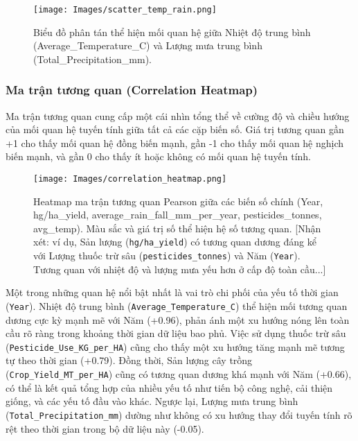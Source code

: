 \begin{figure}[htb] 
    \centering
    \texttt{[image: Images/scatter\_temp\_rain.png]}
    \vspace{8pt}
    \caption{Biểu đồ phân tán thể hiện mối quan hệ giữa Nhiệt độ trung bình (Average\_Temperature\_C) và Lượng mưa trung bình (Total\_Precipitation\_mm).}
    \label{fig:scatter_temp_rain} 
\end{figure}

\FloatBarrier 


\subsubsection{Ma trận tương quan (Correlation Heatmap)}

Ma trận tương quan cung cấp một cái nhìn tổng thể về cường độ và chiều hướng của mối quan hệ tuyến tính giữa tất cả các cặp biến số. Giá trị tương quan gần +1 cho thấy mối quan hệ đồng biến mạnh, gần -1 cho thấy mối quan hệ nghịch biến mạnh, và gần 0 cho thấy ít hoặc không có mối quan hệ tuyến tính.

\begin{figure}[H]
    \centering
    \texttt{[image: Images/correlation\_heatmap.png]}
    \vspace{8pt}
        \caption{Heatmap ma trận tương quan Pearson giữa các biến số chính (Year, hg/ha\_yield, average\_rain\_fall\_mm\_per\_year, pesticides\_tonnes, avg\_temp). Màu sắc và giá trị số thể hiện hệ số tương quan. [Nhận xét: ví dụ, Sản lượng (\texttt{hg/ha\_yield}) có tương quan dương đáng kể với Lượng thuốc trừ sâu (\texttt{pesticides\_tonnes}) và Năm (\texttt{Year}). Tương quan với nhiệt độ và lượng mưa yếu hơn ở cấp độ toàn cầu...]}
    \label{fig:corr_matrix_detailed}
\end{figure}

Một trong những quan hệ nổi bật nhất là vai trò chi phối của yếu tố thời gian (\texttt{Year}). Nhiệt độ trung bình (\texttt{Average\_Temperature\_C}) thể hiện mối tương quan dương cực kỳ mạnh mẽ với Năm (+0.96), phản ánh một xu hướng nóng lên toàn cầu rõ ràng trong khoảng thời gian dữ liệu bao phủ. Việc sử dụng thuốc trừ sâu (\texttt{Pesticide\_Use\_KG\_per\_HA}) cũng cho thấy một xu hướng tăng mạnh mẽ tương tự theo thời gian (+0.79). Đồng thời, Sản lượng cây trồng (\texttt{Crop\_Yield\_MT\_per\_HA}) cũng có tương quan dương khá mạnh với Năm (+0.66), có thể là kết quả tổng hợp của nhiều yếu tố như tiến bộ công nghệ, cải thiện giống, và các yếu tố đầu vào khác. Ngược lại, Lượng mưa trung bình (\texttt{Total\_Precipitation\_mm}) dường như không có xu hướng thay đổi tuyến tính rõ rệt theo thời gian trong bộ dữ liệu này (-0.05).

